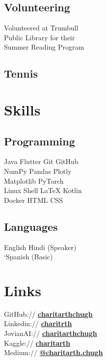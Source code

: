 \documentclass[]{resume-template}
\begin{document}
\begin{minipage}[t]{0.33\textwidth}
\subsection{Volunteering}\label{subsec:volunteering}
Volunteered at Trumbull \\
Public Library for their\\
Summer Reading Program
\sectionsep{}


\subsection{Tennis}

\section{Skills}\label{sec:skills}

\subsection{Programming}\label{subsec:programming}
Java \textbullet{} Flutter \textbullet{} Git \textbullet{} GitHub\\
NumPy \textbullet{} Pandas \textbullet{} Plotly\\
Matplotlib \textbullet{} PyTorch \\
Linux \textbullet{} Shell \textbullet{}  \LaTeX{} \textbullet{} Kotlin\\
Docker \textbullet{}  HTML \textbullet{}  CSS
\sectionsep{}

\subsection{Languages}
English \textbullet{} Hindi (Speaker)\\ 
`Spanish (Basic) 

\section{Links}\label{sec:links}
GitHub:// \href{https://github.com/charitarthchugh}{\textbf {charitarthchugh}} \\
Linkedin:// \href{https:///www.linkedin.com/in/charitarth}{\textbf {charitrth}} \\
JovianAI:// \href{https://jovian.ai/charitarthchugh}{\textbf{charitarthchugh}}\\
Kaggle:// \href{https://kaggle.com/charitarth}{\textbf{charitarth}}\\
Medium:// \href{https://medium.com/@charitarth.chugh}{\textbf{@charitarth.chugh}}
%
%

\end{minipage} 
\end{document}
